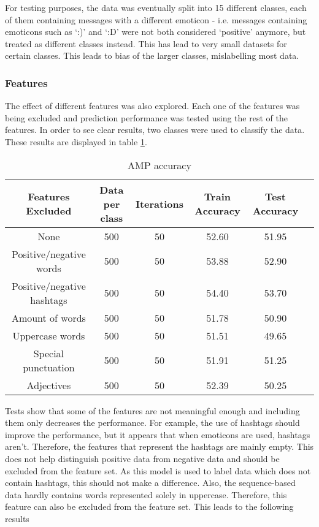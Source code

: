 \noindent For testing purposes, the data was eventually split into 15 different classes, each of them containing messages with a different emoticon - i.e. messages containing emoticons such as `:)' and `:D' were not both considered `positive' anymore, but treated as different classes instead. This has lead to very small datasets for certain classes. This leads to bias of the larger classes, mislabelling most data.


\subsubsection*{Features}

The effect of different features was also explored. Each one of the features was being excluded and prediction performance was tested using the rest of the features. In order to see clear results, two classes were used to classify the data. These results are displayed in table \ref{table:AMPfeatures}.

\begin{table}[h!]
\begin{center}
\begin{tabular}{| c | c | c | c | c | c |}
\hline
 {\textbf{Features Excluded}} 	 
 & {\textbf{Data per class}} 					& {\textbf{Iterations}} 
 & {\textbf{Train Accuracy}} 					& {\textbf{Test Accuracy}} 
 \\
\hline
None		&				500	&	50	&	52.60	& 	51.95	\\
Positive/negative words	&		500	&	50	&	53.88	&	52.90	\\
Positive/negative hashtags	&	500	&	50	&	54.40	&	53.70	\\
Amount of words	&		500	&	50	&	51.78	&	50.90	\\
Uppercase words	&		500	&	50	&	51.51	&	49.65	\\
Special punctuation	&	500	&	50	&	51.91	&	51.25	\\
Adjectives	&			500	&	50	&	52.39	&	50.25	\\
\hline
\end{tabular}
\caption{AMP accuracy}
\label{table:AMPfeatures}
\end{center}
\end{table}


Tests show that some of the features are not meaningful enough and including them only decreases the performance. For example, the use of hashtags should improve the performance, but it appears that when emoticons are used, hashtags aren't. Therefore, the features that represent the hashtags are mainly empty. This does not help distinguish positive data from negative data and should be excluded from the feature set. As this model is used to label data which does not contain hashtags, this should not make a difference. Also, the sequence-based data hardly contains words represented solely in uppercase. Therefore, this feature can also be excluded from the feature set. This leads to the following results

